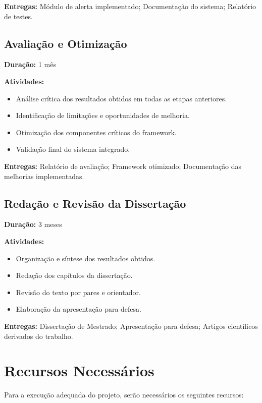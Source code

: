 \textbf{Entregas:} Módulo de alerta implementado; Documentação do sistema; Relatório de testes.

\subsection{Avaliação e Otimização}
\textbf{Duração:} 1 mês

\textbf{Atividades:}
\begin{itemize}[noitemsep]
    \item Análise crítica dos resultados obtidos em todas as etapas anteriores.
    \item Identificação de limitações e oportunidades de melhoria.
    \item Otimização dos componentes críticos do framework.
    \item Validação final do sistema integrado.
\end{itemize}

\textbf{Entregas:} Relatório de avaliação; Framework otimizado; Documentação das melhorias implementadas.

\subsection{Redação e Revisão da Dissertação}
\textbf{Duração:} 3 meses

\textbf{Atividades:}
\begin{itemize}[noitemsep]
    \item Organização e síntese dos resultados obtidos.
    \item Redação dos capítulos da dissertação.
    \item Revisão do texto por pares e orientador.
    \item Elaboração da apresentação para defesa.
\end{itemize}

\textbf{Entregas:} Dissertação de Mestrado; Apresentação para defesa; Artigos científicos derivados do trabalho.

\section{Recursos Necessários}

Para a execução adequada do projeto, serão necessários os seguintes recursos:

